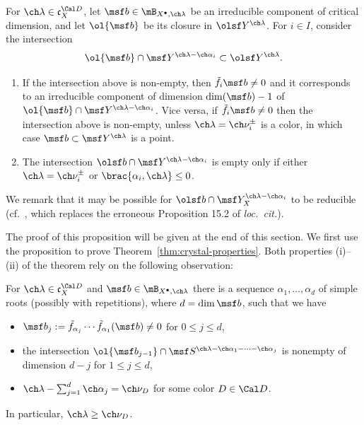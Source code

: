 \begin{prop}
\notready \label{prop:f-hyper}
For $\ch\lambda\in \mathfrak c_X^{\Cal D}$, let $\msf b \in \mB_{X^\bullet,\ch\lambda}$ be an irreducible component of critical dimension, and let $\ol{\msf b}$
be its closure in $\olsf Y^{\ch\lambda}$. For $i\in I$, consider the
intersection
\[ \ol{\msf b} \cap \msf Y^{\ch\lambda-\ch\alpha_i} \subset \olsf Y^{\ch\lambda}. \]

\begin{enumerate}
\item
If the intersection above is non-empty, then $\tilde f_i \msf b \ne 0$
and it corresponds to an irreducible component of dimension $\dim(\msf b) -1$
of $\ol{\msf b} \cap \msf Y^{\ch\lambda-\ch\alpha_i}$. Vice versa, if $\tilde f_i \msf b \ne 0$ then the intersection above is non-empty, unless $\ch\lambda=\ch\nu_i^\pm$ is a color, in which case $\msf b \subset \msf Y^{\ch\lambda}$ is a point.

\item The intersection $\olsf b \cap \msf Y^{\ch\lambda-\ch\alpha_i}$ is empty
only if either $\ch\lambda=\ch\nu_i^\pm$ or $\brac{\alpha_i, \ch\lambda} \le 0$.
\end{enumerate}
\end{prop}

We remark that it may be possible for $\olsf b \cap \msf Y^{\ch\lambda-\ch\alpha_i}_X$
to be reducible (cf.~\cite[Proposition 19.2]{BFG}, which replaces the erroneous
Proposition 15.2 of \emph{loc.~cit.}).

The proof of this proposition will be given at the end of this section. We first use
the proposition to prove Theorem~\ref{thm:crystal-properties}.
Both properties (i)--(ii) of the theorem rely on the following observation:

\begin{lem}
\notready
\label{lem:lowering}
  For $\ch\lambda \in \mathfrak c^{\Cal D}_X$ and $\msf b \in \mB_{X^\bullet,\ch\lambda}$
there is a sequence $\alpha_1, \dots,\alpha_d$ of simple roots (possibly with repetitions), where $d = \dim \msf b$, such that
we have
\begin{itemize}
\item $\msf b_j := \tilde f_{\alpha_{j}} \dotsb \tilde f_{\alpha_1}(\msf b) \ne 0$
for $0\le j \le d$,
\item
the intersection $\ol{\msf b_{j-1}} \cap \msf S^{\ch\lambda - \ch\alpha_1 - \cdots -\ch\alpha_j}$ is nonempty of dimension $d-j$ for $1\le j \le d$,
\item $\ch\lambda - \sum_{j=1}^d \ch\alpha_j = \ch\nu_D$ for some color $D \in \Cal D$.
\end{itemize}
In particular, $\ch\lambda \ge \ch\nu_D$.
\end{lem}

